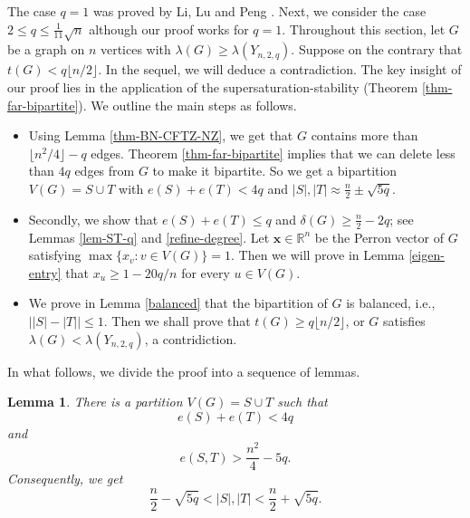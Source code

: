 \documentclass[11pt]{article}
\newtheorem{lemma}[theorem]{Lemma}
\begin{document}
The case $q=1$ was proved by Li, Lu and Peng \cite{LLP2024-AAM}. 
Next, we consider the case $2\le q \le \frac{1}{11}\sqrt{n}$
although our proof works for $q=1$. 
Throughout this section, 
let $G$ be a graph on $n$ vertices with
 $\lambda (G)\ge \lambda (Y_{n,2,q})$. 
Suppose on the contrary that $t(G)< q\lfloor {n}/{2}\rfloor$. 
In the sequel, we will deduce a contradiction. 
The key insight of our proof lies in the application of the supersaturation-stability (Theorem \ref{thm-far-bipartite}). 
We outline the main steps as follows. 

\begin{itemize}
\item[\ding{73}] 
Using Lemma \ref{thm-BN-CFTZ-NZ}, 
we get that $G$ contains more than $\lfloor n^2/4\rfloor - q$ edges. 
Theorem \ref{thm-far-bipartite} 
implies that we can delete less than 
$4q$ edges from $G$ to make it bipartite. 
So we get a bipartition $V(G) =S\cup T$ with 
$e(S) + e(T)< 4q$ and $ |S|,|T| \approx \frac{n}{2} \pm \sqrt{5q}$. 


\item[\ding{73}] 
Secondly, we show that 
$e(S) + e(T)\le q$ and  $\delta (G) \ge \frac{n}{2} - 2q$; see Lemmas \ref{lem-ST-q} and \ref{refine-degree}. 
Let $\bm{x}\in \mathbb{R}^n$ be the Perron vector of $G$ satisfying $\max\{x_v: v\in V(G)\}=1$. 
Then we will prove in Lemma \ref{eigen-entry} 
that ${x}_u \ge 1- {20q}/{n}$ 
for every $u\in V(G)$.



\item[\ding{73}] 
We prove in Lemma \ref{balanced} 
that the bipartition of $G$ 
is balanced, i.e., $\bigl| |S| - |T|\bigr| \le 1$. 
Then we shall prove that 
$t(G)\ge q\lfloor n/2\rfloor$, 
or $G$ satisfies $\lambda (G) < \lambda (Y_{n,2,q})$, a contridiction. 

\end{itemize}


In what follows, we divide the proof into a sequence of lemmas.  

 
 \begin{lemma} \label{approx-partition} 
 There is a partition $V(G)=S\cup T$ such that 
 \[  e(S) + e(T)< 4q  \]
 and 
 \[ e(S,T)> \frac{n^2}{4} - 5q. \]
Consequently, we get 
 \[ \frac{n}{2} - \sqrt{5q} < |S|, |T| < \frac{n}{2} + \sqrt{5q}.  \]
 \end{lemma}
 
\end{document}
